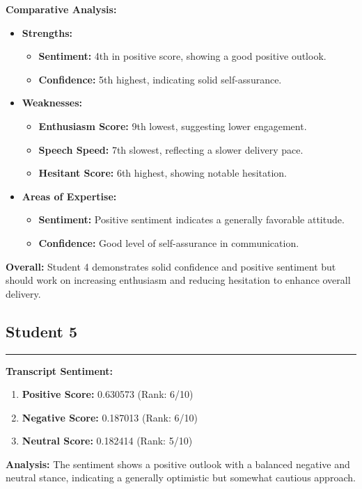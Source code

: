 \documentclass{article}
\begin{document}
\textbf{Comparative Analysis:}
\begin{itemize}
    \item \textbf{Strengths:}
    \begin{itemize}
        \item \textbf{Sentiment:} 4th in positive score, showing a good positive outlook.
        \item \textbf{Confidence:} 5th highest, indicating solid self-assurance.
    \end{itemize}
    \item \textbf{Weaknesses:}
    \begin{itemize}
        \item \textbf{Enthusiasm Score:} 9th lowest, suggesting lower engagement.
        \item \textbf{Speech Speed:} 7th slowest, reflecting a slower delivery pace.
        \item \textbf{Hesitant Score:} 6th highest, showing notable hesitation.
    \end{itemize}
    \item \textbf{Areas of Expertise:}
    \begin{itemize}
        \item \textbf{Sentiment:} Positive sentiment indicates a generally favorable attitude.
        \item \textbf{Confidence:} Good level of self-assurance in communication.
    \end{itemize}
\end{itemize}

\textbf{Overall:} Student 4 demonstrates solid confidence and positive sentiment but should work on increasing enthusiasm and reducing hesitation to enhance overall delivery.



\subsection{Student 5}
\begin{center}
    \color{green}\rule{1\linewidth}{0.7mm}
\end{center}

\large{\textbf{Transcript Sentiment:}}
\begin{tcolorbox}[colback=green!5!white,colframe=green!75!black,title=Sentiment Breakdown]
    \begin{enumerate}
        \item \textbf{Positive Score:} \textcolor{green!70!black}{0.630573} (Rank: 6/10)
        \item \textbf{Negative Score:} \textcolor{red!70!black}{0.187013} (Rank: 6/10)
        \item \textbf{Neutral Score:} \textcolor{blue!70!black}{0.182414} (Rank: 5/10)
    \end{enumerate}
\end{tcolorbox}
    \textbf{Analysis:} The sentiment shows a positive outlook with a balanced negative and neutral stance, indicating a generally optimistic but somewhat cautious approach.
\end{document}
